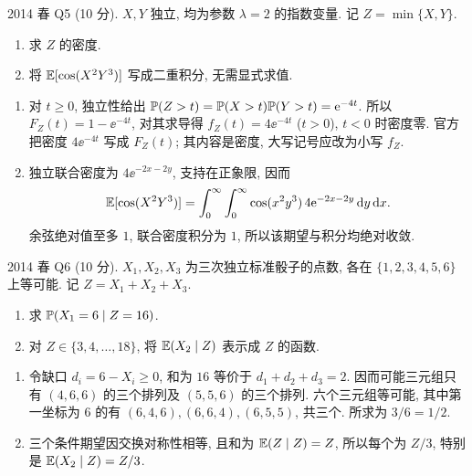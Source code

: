\begin{exercise}\label{ex:fe2014q5}
2014 春 Q5 (10 分). $X,Y$ 独立, 均为参数 $\lambda=2$ 的指数变量. 记 $Z=\min\{X,Y\}$.
\begin{enumerate}[label=(\alph*)]
\item\label{ex:fe2014q5-a} 求 $Z$ 的密度.
\item\label{ex:fe2014q5-b} 将 $\mathbb E[\cos(X^2Y^3)]$ 写成二重积分, 无需显式求值.
\end{enumerate}
\end{exercise}
\begin{solution}
\begin{enumerate}[label=(\alph*)]
\item\label{sol:fe2014q5-a} 对 $t\ge0$, 独立性给出 $\mathbb P(Z>t)=\mathbb P(X>t)\mathbb P(Y>t)=\mathrm e^{-4t}$. 所以 $F_Z(t)=1-\ee^{-4t}$, 对其求导得 $f_Z(t)=4\ee^{-4t}$ ($t>0$), $t<0$ 时密度零. 官方把密度 $4\ee^{-4t}$ 写成 $F_Z(t)$; 其内容是密度, 大写记号应改为小写 $f_Z$.
\item\label{sol:fe2014q5-b} 独立联合密度为 $4\ee^{-2x-2y}$, 支持在正象限, 因而
\[
 \mathbb E[\cos(X^2Y^3)]=\int_0^\infty\int_0^\infty
 \cos(x^2y^3)\,4\mathrm e^{-2x-2y}\,\mathrm d y\,\mathrm d x.
\]
余弦绝对值至多 $1$, 联合密度积分为 $1$, 所以该期望与积分均绝对收敛.
\end{enumerate}
\end{solution}

\begin{exercise}\label{ex:fe2014q6}
2014 春 Q6 (10 分). $X_1,X_2,X_3$ 为三次独立标准骰子的点数, 各在 $\{1,2,3,4,5,6\}$ 上等可能. 记 $Z=X_1+X_2+X_3$.
\begin{enumerate}[label=(\alph*)]
\item\label{ex:fe2014q6-a} 求 $\mathbb P(X_1=6\mid Z=16)$.
\item\label{ex:fe2014q6-b} 对 $Z\in\{3,4,\ldots,18\}$, 将 $\mathbb E(X_2\mid Z)$ 表示成 $Z$ 的函数.
\end{enumerate}
\end{exercise}
\begin{solution}
\begin{enumerate}[label=(\alph*)]
\item\label{sol:fe2014q6-a} 令缺口 $d_i=6-X_i\ge0$, 和为 $16$ 等价于 $d_1+d_2+d_3=2$. 因而可能三元组只有 $(4,6,6)$ 的三个排列及 $(5,5,6)$ 的三个排列. 六个三元组等可能, 其中第一坐标为 $6$ 的有 $(6,4,6),(6,6,4),(6,5,5)$, 共三个. 所求为 $3/6=1/2$.
\item\label{sol:fe2014q6-b} 三个条件期望因交换对称性相等, 且和为 $\mathbb E(Z\mid Z)=Z$, 所以每个为 $Z/3$, 特别是 $\mathbb E(X_2\mid Z)=Z/3$.
\end{enumerate}
\end{solution}

